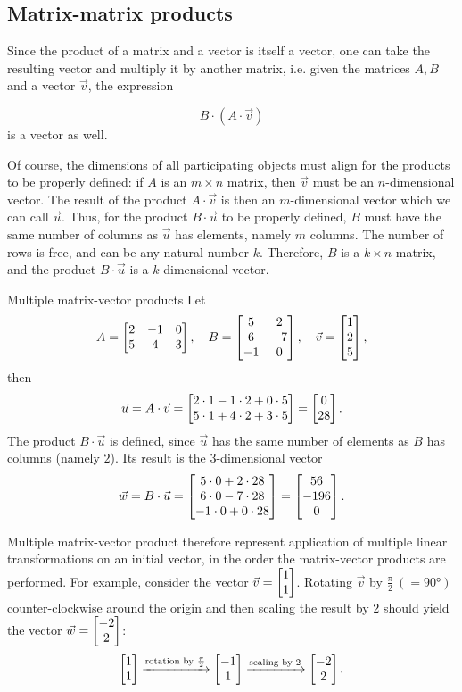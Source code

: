 \subsection{Matrix-matrix products}
Since the product of a matrix and a vector is itself a vector, one can take the resulting vector and multiply it by another matrix, i.e. given the matrices $A,B$ and a vector $\vec{v}$, the expression

\vspace{2em}
\[
	B\cdot \left( A\cdot\vec{v} \right)
\]
is a vector as well.

Of course, the dimensions of all participating objects must align for the products to be properly defined: if $A$ is an $m\times n$ matrix, then $\vec{v}$ must be an $n$-dimensional vector. The result of the product $A\cdot\vec{v}$ is then an $m$-dimensional vector which we can call $\vec{u}$. Thus, for the product $B\cdot\vec{u}$ to be properly defined, $B$ must have the same number of columns as $\vec{u}$ has elements, namely $m$ columns. The number of rows is free, and can be any natural number $k$. Therefore, $B$ is a $k\times n$ matrix, and the product $B\cdot\vec{u}$ is a $k$-dimensional vector.

\begin{example}{Multiple matrix-vector products}{}
	Let
	\[
		A=\begin{bmatrix}2 & -1 & 0\\5 & 4 & 3\end{bmatrix},\quad B=\begin{bmatrix} 5 & 2\\6 & -7\\-1 & 0\end{bmatrix},\quad \vec{v}=\colvec{1;2;5},
	\]
	then
	\[
		\vec{u} = A\cdot\vec{v} = \colvec{2\cdot1-1\cdot2+0\cdot5;5\cdot1+4\cdot2+3\cdot5} = \colvec{0;28}.
	\]
	The product $B\cdot\vec{u}$ is defined, since $\vec{u}$ has the same number of elements as $B$ has columns (namely $2$). Its result is the $3$-dimensional vector
	\[
		\vec{w} = B\cdot\vec{u} = \colvec{5\cdot0+2\cdot28;6\cdot0-7\cdot28;-1\cdot0+0\cdot28} = \colvec{56;-196;0}.
	\]
\end{example}

Multiple matrix-vector product therefore represent application of multiple linear transformations on an initial vector, in the order the matrix-vector products are performed. For example, consider the vector $\vec{v}=\colvec{1;1}$. Rotating $\vec{v}$ by $\frac{\pi}{2}\ (=\ang{90})$ counter-clockwise around the origin and then scaling the result by $2$ should yield the vector $\vec{w}=\colvec{-2;2}$:
\[
	\colvec{1;1} \xrightarrow[] {\text{rotation by $\frac{\pi}{2}$}} \colvec{-1;1} \xrightarrow[] {\text{scaling by $2$}} \colvec{-2;2}.
\]


